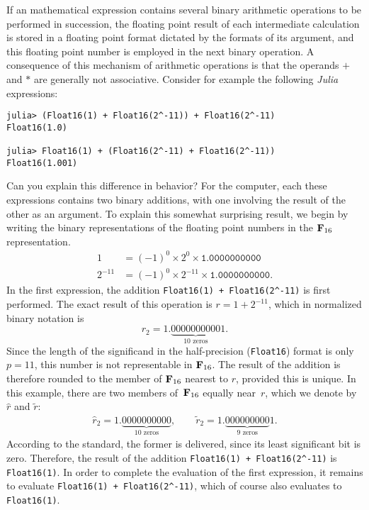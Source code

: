 If an mathematical expression contains several binary arithmetic operations to be performed in succession,
the floating point result of each intermediate calculation is stored in a floating point format dictated by the formats of its argument,
and this floating point number is employed in the next binary operation.
A consequence of this mechanism of arithmetic operations is that the operands $+$ and $*$ are generally not associative.
Consider for example the following \emph{Julia} expressions:
\begin{code}
    \label{code:non_associativity}
\begin{verbatim}
julia> (Float16(1) + Float16(2^-11)) + Float16(2^-11)
Float16(1.0)

julia> Float16(1) + (Float16(2^-11) + Float16(2^-11))
Float16(1.001)
\end{verbatim}
\end{code}
Can you explain this difference in behavior?
For the computer, each these expressions contains two binary additions,
with one involving the result of the other as an argument.
To explain this somewhat surprising result,
we begin by writing the binary representations of the floating point numbers in the $\mathbf F_{16}$ representation.
\begin{align*}
    1 &= (-1)^0 \times 2^0 \times \texttt{1.0000000000} \\
    2^{-11} &= (-1)^0 \times 2^{-11} \times \texttt{1.0000000000}.
\end{align*}
In the first expression,
the addition \texttt{Float16(1) + Float16(2^-11)} is first performed.
The exact result of this operation is $r = 1 + 2^{-11}$,
which in normalized binary notation is
\[
    r_2 = 1.\underbrace{0000000000}_{\text{10 zeros}}1.
\]
Since the length of the significand in the half-precision (\texttt{Float16}) format is only $p = 11$,
this number is not representable in $\mathbf F_{16}$.
The result of the addition is therefore rounded to the member of $\mathbf F_{16}$ nearest to $r$,
provided this is unique.
In this example, there are two members of~$\mathbf F_{16}$ equally near~$r$,
which we denote by $\widehat r$ and $\widetilde r$:
\begin{align*}
    \widehat r_2 = 1.\underbrace{0000000000}_{\text{10 zeros}},
    \qquad
    \widetilde r_2 = 1.\underbrace{000000000}_{\text{9 zeros}}1.
\end{align*}
According to the standard,
the former is delivered, since its least significant bit is zero.
Therefore, the result of the addition \texttt{Float16(1) + Float16(2^-11)}
is \texttt{Float16(1)}.
In order to complete the evaluation of the first expression,
it remains to evaluate
\texttt{Float16(1) + Float16(2^-11)},
which of course also evaluates to \texttt{Float16(1)}.

